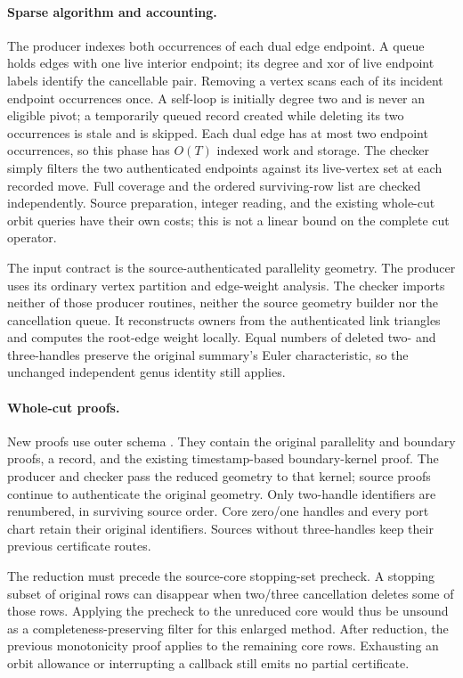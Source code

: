 \paragraph{Sparse algorithm and accounting.}
The producer indexes both occurrences of each dual edge endpoint. A queue
holds edges with one live interior endpoint; its degree and xor of live
endpoint labels identify the cancellable pair. Removing a vertex scans each
of its incident endpoint occurrences once. A self-loop is initially degree
two and is never an eligible pivot; a temporarily queued record created
while deleting its two occurrences is stale and is skipped. Each dual edge
has at most two endpoint occurrences, so this phase has $O(T)$ indexed work
and storage. The checker simply filters the two authenticated endpoints
against its live-vertex set at each recorded move. Full coverage and the
ordered surviving-row list are checked independently. Source preparation,
integer reading, and the existing whole-cut orbit queries have their own
costs; this is not a linear bound on the complete cut operator.

The input contract is the source-authenticated parallelity geometry. The
producer uses its ordinary vertex partition and edge-weight analysis. The
checker imports neither of those producer routines, neither the source
geometry builder nor the cancellation queue. It reconstructs owners from
the authenticated link triangles and computes the root-edge weight locally.
Equal numbers of deleted two- and three-handles preserve the original
summary's Euler characteristic, so the unchanged independent genus identity
still applies.

\paragraph{Whole-cut proofs.}
New proofs use outer schema . They contain
the original parallelity and boundary proofs, a
 record, and the existing timestamp-based
boundary-kernel proof. The producer and checker pass the reduced geometry to
that kernel; source proofs continue to authenticate the original geometry.
Only two-handle identifiers are renumbered, in surviving source order.
Core zero/one handles and every port chart retain their original identifiers.
Sources without three-handles keep their previous certificate routes.

The reduction must precede the source-core stopping-set precheck. A stopping
subset of original rows can disappear when two/three cancellation deletes
some of those rows. Applying the precheck to the unreduced core would thus
be unsound as a completeness-preserving filter for this enlarged method.
After reduction, the previous monotonicity proof applies to the remaining
core rows. Exhausting an orbit allowance or interrupting a callback still
emits no partial certificate.

